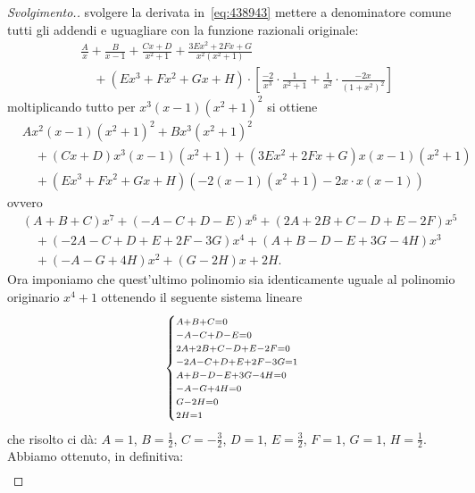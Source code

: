 \begin{proof}[Svolgimento.]
svolgere la derivata in~\eqref{eq:438943} mettere a denominatore
comune tutti gli addendi e uguagliare con la funzione razionali originale:
\begin{align*}
  &\frac{A}{x} + \frac{B}{x-1} + \frac{Cx+D}{x^2+1}
  + \frac{3 E x^2 + 2 F x + G}{x^2(x^2+1)} \\
  & \quad + (E x^3 + F x^2 + G x + H)\cdot \left[\frac{-2}{x^3}\cdot \frac{1}{x^2+1}
  + \frac{1}{x^2}\cdot\frac{-2x}{(1+x^2)^2}\right]
\end{align*}
moltiplicando tutto per $x^3(x-1)(x^2+1)^2$ si ottiene
\begin{align*}
  &Ax^2(x-1)(x^2+1)^2 + Bx^3(x^2+1)^2 \\
  &\quad + (Cx+D)x^3(x-1)(x^2+1) + (3Ex^2+2Fx+G)x(x-1)(x^2+1)\\
  &\quad + (Ex^3+Fx^2+Gx+H)(-2(x-1)(x^2+1)-2x\cdot x(x-1))
\end{align*}
ovvero
\begin{align*}
  &(A+B+C)x^7+(-A-C+D-E)x^6 + (2A+2B+C-D+E-2F)x^5 \\
  &\quad  +(-2A-C+D+E+2F-3G)x^4 + (A+B-D-E+3G-4H)x^3 \\
  &\quad  + (-A-G+4H)x^2 + (G-2H) x + 2H.
\end{align*}
Ora imponiamo che quest'ultimo polinomio sia identicamente uguale
al polinomio originario $x^4+1$ ottenendo il seguente sistema lineare
\[
  \begin{dcases}
    \scriptstyle
    A+B+C=0 \\[-1ex]
    \scriptstyle
    -A-C+D-E=0 \\[-1ex]
    \scriptstyle
    2A + 2B + C - D + E - 2 F = 0\\[-1ex]
    \scriptstyle
    -2A-C+D+E+2F-3G = 1\\[-1ex]
    \scriptstyle
    A+B-D-E+3G-4H=0\\[-1ex]
    \scriptstyle
    -A-G+4H=0\\[-1ex]
    \scriptstyle
    G-2H=0\\[-1ex]
    \scriptstyle
    2H=1
  \end{dcases}
\]
che risolto ci dà: $A=1$, $B=\frac 1 2$, $C = -\frac 3 2$, $D=1$, $E=\frac 3 2$, $F=1$, $G=1$, $H=\frac 1 2$.
Abbiamo ottenuto, in definitiva:
\begin{align*}

\end{align*}
\end{proof}
